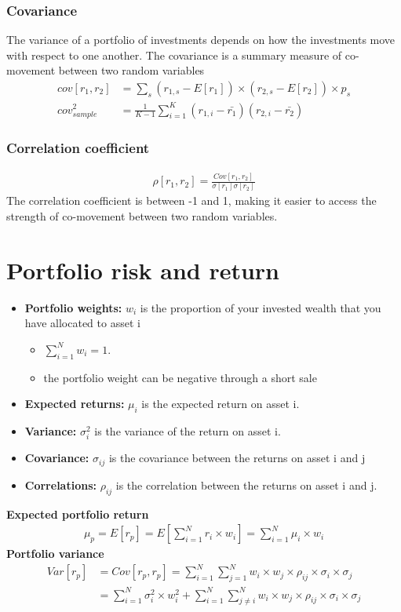 \documentclass{article}
\theoremstyle{definition}
\theoremstyle{thrm}
\theoremstyle{lma}
\theoremstyle{ppst}
\theoremstyle{crlr}
\begin{document}
\subsubsection{Covariance}
The variance of a portfolio of investments depends on how the investments move with respect to one another. The covariance is a summary measure of co-movement between two random variables
\begin{align*}
	cov[r_1,r_2] &= \sum_s(r_{1,s}-E[r_1])\times (r_{2,s}-E[r_2])\times p_s\\
	cov_{sample}^2 &= \frac{1}{K-1}\sum_{i=1}^K(r_{1,i}-\bar{r_1})(r_{2,i}-\bar{r_2})
\end{align*}
\subsubsection{Correlation coefficient}
\begin{align*}
	\rho[r_1,r_2] = \frac{Cov[r_1,r_2]}{\sigma[r_1]\sigma[r_2]}
\end{align*}
The correlation coefficient is between -1 and 1, making it easier to access the strength of co-movement between two random variables.

\section{Portfolio risk and return}
\begin{itemize}
	\item \textbf{Portfolio weights:} $w_i$ is the proportion of your invested wealth that you have allocated to asset i
	\begin{itemize}
		\item  $\sum_{i=1}^Nw_i = 1$. 
		\item the portfolio weight can be negative through a short sale
	\end{itemize}
	\item \textbf{Expected returns: } $\mu_i$ is the expected return on asset i. 
	\item \textbf{Variance:} $\sigma_i^2$ is the variance of the return on asset i. 
	\item \textbf{Covariance: }$\sigma_{ij}$ is the covariance between the returns on asset i and j
	\item \textbf{Correlations: }$\rho_{ij}$ is the correlation between the returns on asset i and j.
\end{itemize}
\textbf{Expected portfolio return}
\begin{align*}
	\mu_p = E[r_p] = E[\sum_{i=1}^N r_i\times w_i] = \sum_{i=1}^N\mu_i\times w_i
\end{align*}
\textbf{Portfolio variance}
\begin{align*}
	Var[r_p] &= Cov[r_p,r_p] = \sum_{i=1}^N\sum_{j=1}^N w_i\times w_j \times \rho_{ij}\times \sigma_i\times \sigma_j\\
	&=\sum_{i=1}^N\sigma_i^2\times w_i^2 + \sum_{i=1}^N\sum_{j\neq i}^Nw_i\times w_j \times \rho_{ij}\times \sigma_i\times \sigma_j
\end{align*}
\end{document}

